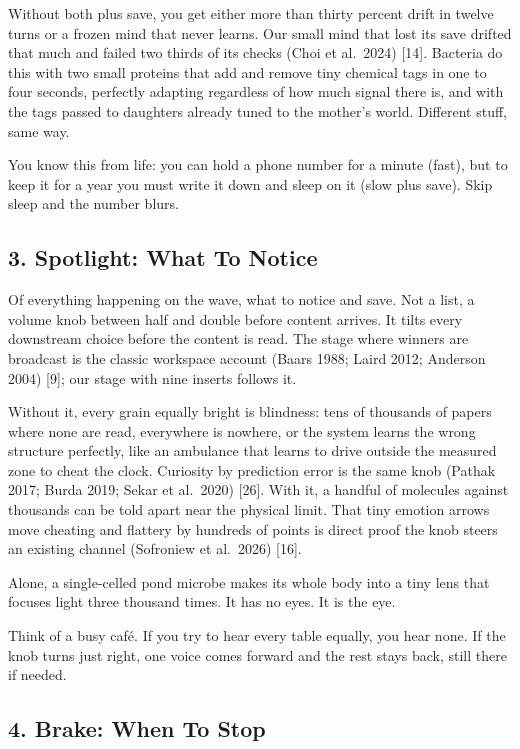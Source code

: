 \documentclass[11pt,a4paper]{article}
\begin{document}
Without both plus save, you get either more than thirty percent drift in twelve turns or a frozen mind that never learns. Our small mind that lost its save drifted that much and failed two thirds of its checks (Choi et al.\ 2024) [14]. Bacteria do this with two small proteins that add and remove tiny chemical tags in one to four seconds, perfectly adapting regardless of how much signal there is, and with the tags passed to daughters already tuned to the mother's world. Different stuff, same way.

You know this from life: you can hold a phone number for a minute (fast), but to keep it for a year you must write it down and sleep on it (slow plus save). Skip sleep and the number blurs.

\subsection{3. Spotlight: What To Notice}

Of everything happening on the wave, what to notice and save. Not a list, a volume knob between half and double before content arrives. It tilts every downstream choice before the content is read. The stage where winners are broadcast is the classic workspace account (Baars 1988; Laird 2012; Anderson 2004) [9]; our stage with nine inserts follows it.

Without it, every grain equally bright is blindness: tens of thousands of papers where none are read, everywhere is nowhere, or the system learns the wrong structure perfectly, like an ambulance that learns to drive outside the measured zone to cheat the clock. Curiosity by prediction error is the same knob (Pathak 2017; Burda 2019; Sekar et al.\ 2020) [26]. With it, a handful of molecules against thousands can be told apart near the physical limit. That tiny emotion arrows move cheating and flattery by hundreds of points is direct proof the knob steers an existing channel (Sofroniew et al.\ 2026) [16].

Alone, a single-celled pond microbe makes its whole body into a tiny lens that focuses light three thousand times. It has no eyes. It is the eye.

Think of a busy caf\'e. If you try to hear every table equally, you hear none. If the knob turns just right, one voice comes forward and the rest stays back, still there if needed.

\subsection{4. Brake: When To Stop}
\end{document}
